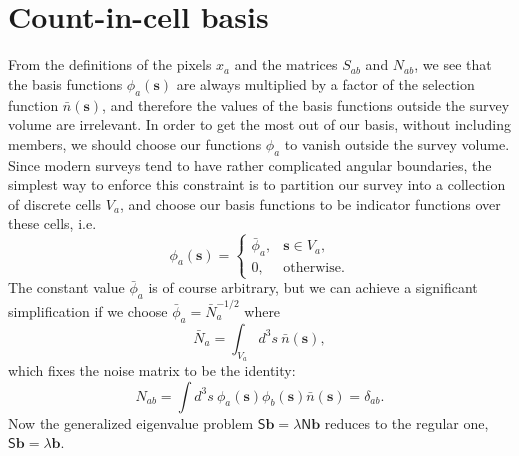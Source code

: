 \documentclass{article}
\renewcommand{\vec}[1]{\bm{#1}}
\newcommand{\mat}[1]{\textsf{#1}}
\newcommand{\nbar}{\bar{n}}
\begin{document}
\section*{Count-in-cell basis}

From the definitions of the pixels $x_a$ and the matrices $S_{ab}$ and
$N_{ab}$, we see that the basis functions $\phi_a(\vec{s})$ are always
multiplied by a factor of the selection function $\nbar(\vec{s})$, and
therefore the values of the basis functions outside the survey volume are
irrelevant.  In order to get the most out of our basis, without including
members, we should choose our functions $\phi_a$ to vanish outside the survey
volume.  Since modern surveys tend to have rather complicated angular
boundaries, the simplest way to enforce this constraint is to partition our
survey into a collection of discrete cells $V_a$, and choose our basis functions
to be indicator functions over these cells, i.e.
\begin{equation}
    \phi_a(\vec{s}) =
    \begin{cases}
        \bar{\phi}_a, & \vec{s} \in V_a, \\
        0, & \text{otherwise}.
    \end{cases}
\end{equation}
The constant value $\bar{\phi}_a$ is of course arbitrary, but we can achieve a
significant simplification if we choose $\bar{\phi}_a = \bar{N}_a^{-1/2}$ where
\begin{equation}
    \bar{N}_a = \int_{V_a} d^3s~ \nbar(\vec{s}),
\end{equation}
which fixes the noise matrix to be the identity:
\begin{equation}
    N_{ab} = \int d^3s~ \phi_a(\vec{s}) \phi_b(\vec{s}) \nbar(\vec{s}) = \delta_{ab}.
\end{equation}
Now the generalized eigenvalue problem $\mat{S} \vec{b} = \lambda \mat{N} \vec{b}$
reduces to the regular one, $\mat{S} \vec{b} = \lambda \vec{b}$.
\end{document}
